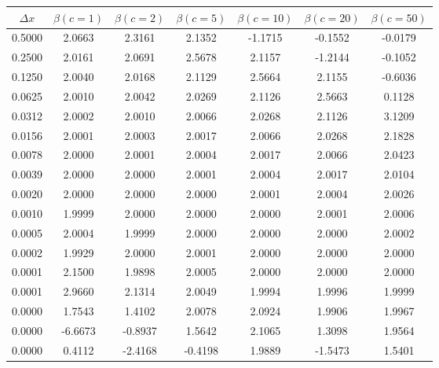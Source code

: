 \begin{tabular}{|c|c|c|c|c|c|c|}
\hline
\textbf{$\Delta x$}&\textbf{$\beta(c=1)$}&\textbf{$\beta(c=2)$}&\textbf{$\beta(c=5)$}&\textbf{$\beta(c=10)$}&\textbf{$\beta(c=20)$}&\textbf{$\beta(c=50)$}\\\hline
0.5000&2.0663&2.3161&2.1352&-1.1715&-0.1552&-0.0179\\\hline
0.2500&2.0161&2.0691&2.5678&2.1157&-1.2144&-0.1052\\\hline
0.1250&2.0040&2.0168&2.1129&2.5664&2.1155&-0.6036\\\hline
0.0625&2.0010&2.0042&2.0269&2.1126&2.5663&0.1128\\\hline
0.0312&2.0002&2.0010&2.0066&2.0268&2.1126&3.1209\\\hline
0.0156&2.0001&2.0003&2.0017&2.0066&2.0268&2.1828\\\hline
0.0078&2.0000&2.0001&2.0004&2.0017&2.0066&2.0423\\\hline
0.0039&2.0000&2.0000&2.0001&2.0004&2.0017&2.0104\\\hline
0.0020&2.0000&2.0000&2.0000&2.0001&2.0004&2.0026\\\hline
0.0010&1.9999&2.0000&2.0000&2.0000&2.0001&2.0006\\\hline
0.0005&2.0004&1.9999&2.0000&2.0000&2.0000&2.0002\\\hline
0.0002&1.9929&2.0000&2.0001&2.0000&2.0000&2.0000\\\hline
0.0001&2.1500&1.9898&2.0005&2.0000&2.0000&2.0000\\\hline
0.0001&2.9660&2.1314&2.0049&1.9994&1.9996&1.9999\\\hline
0.0000&1.7543&1.4102&2.0078&2.0924&1.9906&1.9967\\\hline
0.0000&-6.6673&-0.8937&1.5642&2.1065&1.3098&1.9564\\\hline
0.0000&0.4112&-2.4168&-0.4198&1.9889&-1.5473&1.5401\\\hline
\end{tabular}
